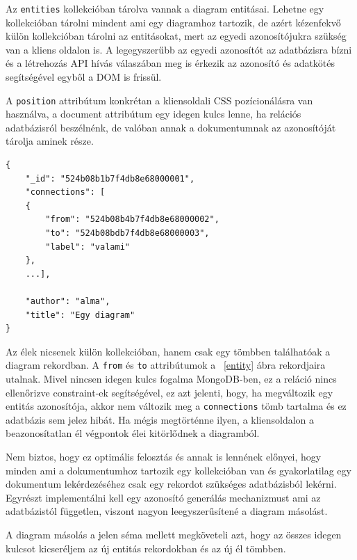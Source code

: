 Az \lstinline{entities} kollekcióban tárolva vannak a diagram entitásai. Lehetne egy kollekcióban tárolni mindent ami egy diagramhoz tartozik, de azért kézenfekvő külön kollekcióban tárolni az entitásokat, mert az egyedi azonosítójukra szükség van a kliens oldalon is. A legegyszerűbb az egyedi azonosítót az adatbázisra bízni és a létrehozás API hívás válaszában meg is érkezik az azonosító és adatkötés segítségével egyből a DOM is frissül.  

A \lstinline{position} attribútum konkrétan a kliensoldali CSS pozícionálásra van használva, a document attribútum egy idegen kulcs lenne, ha relációs adatbázisról beszélnénk, de valóban annak a dokumentumnak az azonosítóját tárolja aminek része.

\begin{lstlisting}[caption=Egy diagram és élei reprezentálása az adatbázisban]
{
    "_id": "524b08b1b7f4db8e68000001",
    "connections": [
    {
        "from": "524b08b4b7f4db8e68000002",
        "to": "524b08bdb7f4db8e68000003",
        "label": "valami"
    },
    ...],

    "author": "alma",
    "title": "Egy diagram" 
}
\end{lstlisting}

Az élek nicsenek külön kollekcióban, hanem csak egy tömbben találhatóak a diagram rekordban. A \lstinline{from} és \lstinline{to} attribútumok a ~\ref{entity} ábra rekordjaira utalnak. Mivel nincsen idegen kulcs fogalma MongoDB-ben, ez a reláció nincs ellenőrizve constraint-ek segítségével, ez azt jelenti, hogy, ha megváltozik egy entitás azonosítója, akkor nem változik meg a \lstinline{connections} tömb tartalma és ez adatbázis sem jelez hibát. Ha mégis megtörténne ilyen, a kliensoldalon a beazonosítatlan él végpontok élei kitörlődnek a diagramból. 

Nem biztos, hogy ez optimális felosztás és annak is lennének előnyei, hogy minden ami a dokumentumhoz tartozik egy kollekcióban van és gyakorlatilag egy dokumentum lekérdezéséhez csak egy rekordot szükséges adatbázisból lekérni. Egyrészt implementálni kell egy azonosító generálás mechanizmust ami az adatbázistól független, viszont nagyon leegyszerűsítené a diagram másolást.

A diagram másolás a jelen séma mellett megköveteli azt, hogy az összes idegen kulcsot kicseréljem az új entitás rekordokban és az új él tömbben.




